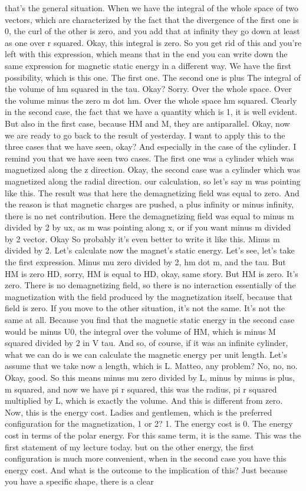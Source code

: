 that's the general situation. When we have the integral of the whole space of two vectors, which are characterized by the fact that the divergence of the first one is 0, the curl of the other is zero, and you add that at infinity they go down at least as one over r squared. Okay, this integral is zero. So you get rid of this and you're left with this expression, which means that in the end you can write down the same expression for magnetic static energy in a different way. We have the first possibility, which is this one. The first one. The second one is plus The integral of the volume of hm squared in the tau. Okay? Sorry. Over the whole space. Over the volume minus the zero m dot hm. Over the whole space hm squared. Clearly in the second case, the fact that we have a quantity which is 1, it is well evident. But also in the first case, because HM and M, they are antiparallel. Okay, now we are ready to go back to the result of yesterday. I want to apply this to the three cases that we have seen, okay? And especially in the case of the cylinder. I remind you that we have seen two cases. The first one was a cylinder which was magnetized along the z direction. Okay, the second case was a cylinder which was magnetized along the radial direction. our calculation, so let's say m was pointing like this. The result was that here the demagnetizing field was equal to zero. And the reason is that magnetic charges are pushed, a plus infinity or minus infinity, there is no net contribution. Here the demagnetizing field was equal to minus m divided by 2 by ux, as m was pointing along x, or if you want minus m divided by 2 vector. Okay So probably it's even better to write it like this. Minus m divided by 2. Let's calculate now the magnet's static energy. Let's see, let's take the first expression. Minus mu zero divided by 2, hm dot m, and the tau. But HM is zero HD, sorry, HM is equal to HD, okay, same story. But HM is zero. It's zero. There is no demagnetizing field, so there is no interaction essentially of the magnetization with the field produced by the magnetization itself, because that field is zero. If you move to the other situation, it's not the same. It's not the same at all. Because you find that the magnetic static energy in the second case would be minus U0, the integral over the volume of HM, which is minus M squared divided by 2 in V tau. And so, of course, if it was an infinite cylinder, what we can do is we can calculate the magnetic energy per unit length. Let's assume that we take now a length, which is L. Matteo, any problem? No, no, no. Okay, good. So this means minus mu zero divided by L, minus by minus is plus, m squared, and now we have pi r squared, this was the radius, pi r squared multiplied by L, which is exactly the volume. And this is different from zero. Now, this is the energy cost. Ladies and gentlemen, which is the preferred configuration for the magnetization, 1 or 2? 1. The energy cost is 0. The energy cost in terms of the polar energy. For this same term, it is the same. This was the first statement of my lecture today. but on the other energy, the first configuration is much more convenient, when in the second case you have this energy cost. And what is the outcome to the implication of this? Just because you have a specific shape, there is a clear 